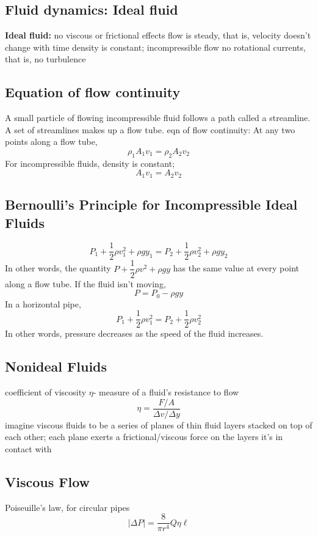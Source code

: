 \documentclass[twocolumn]{article}
\begin{document}
\subsection{Fluid dynamics: Ideal fluid}
\begin{outline}
    \1 \textbf{Ideal fluid:}
        \2 no viscous or frictional effects
        \2 flow is steady, that is, velocity doesn't change with time
        \2 density is constant; incompressible flow
        \2 no rotational currents, that is, no turbulence
\end{outline}
\subsection{Equation of flow continuity}
\begin{outline}
    \1 A small particle of flowing incompressible fluid follows a path called a streamline. A set of streamlines makes up a flow tube.
    \1 eqn of flow continuity:
    \1 At any two points along a flow tube, \[\rho_1A_1v_1=\rho_2A_2v_2\]
    \1 For incompressible fluids, density is constant; \[A_1v_1=A_2v_2\]
\end{outline}
\subsection{Bernoulli's Principle for Incompressible Ideal Fluids}
\begin{outline}
\0 \[P_1+\dfrac{1}{2}\rho v^2_1+\rho gy_1=P_2 +\dfrac{1}{2}\rho v^2_2+\rho gy_2\]
    \1 In other words, the quantity \(P+\dfrac{1}{2}\rho v^2+\rho gy\) has the same value at every point along a flow tube. 
    \1 If the fluid isn't moving, \[P=P_0-\rho gy\]
    \1 In a horizontal pipe, \[P_1+\dfrac{1}{2}\rho v^2_1=P_2 +\dfrac{1}{2}\rho v^2_2\]
    \1 In other words, pressure decreases as the speed of the fluid increases. 
\end{outline}
\subsection{Nonideal Fluids}
\begin{outline}
    \1 coefficient of viscosity $\eta$- measure of a fluid's resistance to flow
\0 \[\eta=\dfrac{F/A}{\Delta v/\Delta y}\]
    \1 imagine viscous fluids to be a series of planes of thin fluid layers stacked on top of each other; each plane exerts a frictional/viscous force on the layers it's in contact with
\end{outline}
\subsection{Viscous Flow}
\begin{outline}
    \1 Poiseuille's law, for circular pipes \[|\Delta P|=\dfrac{8}{\pi r^4}Q\eta\ell\]
\end{outline}
\end{document}
